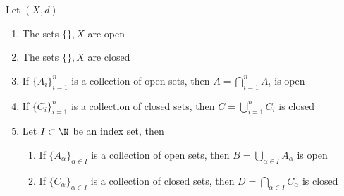 \documentclass[../mmf.tex]{subfiles}
\begin{document}
\begin{prop}
	Let $(X,d)$
	\begin{enumerate}
	\item The sets $\{\},X$ are open
	\item The sets $\{\},X$ are closed
	\item If $\{A_i\}_{i=1}^n$ is a collection of open sets, then $A=\bigcap_{i=1}^nA_i$ is open
	\item If $\{C_i\}_{i=1}^n$ is a collection of closed sets, then $C=\bigcup_{i=1}^nC_i$ is closed
	\item Let $I\subset\N$ be an index set, then
		\begin{enumerate}
		\item If $\{A_\alpha\}_{\alpha\in I}$ is a collection of open sets, then $B=\bigcup_{\alpha\in I}A_\alpha$ is open
		\item If $\{C_\alpha\}_{\alpha\in I}$ is a collection of closed sets, then $D=\bigcap_{\alpha\in I}C_{\alpha}$ is closed
		\end{enumerate}
	\end{enumerate}
\end{prop}
\end{document}
